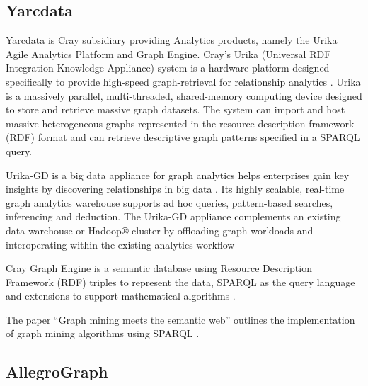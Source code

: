 {     \pv
     
\subsection{Yarcdata \cv}

     Yarcdata is Cray subsidiary providing Analytics
     products, namely the Urika Agile Analytics Platform and Graph
     Engine. Cray’s Urika (Universal RDF Integration Knowledge
     Appliance) system is a hardware
     platform designed specifically to provide high-speed
     graph-retrieval for relationship analytics \cite{www-Urika-appliance}.
     Urika is a massively
     parallel, multi-threaded, shared-memory computing device designed
     to store and retrieve massive graph datasets. The system can
     import and host massive heterogeneous graphs represented in the
     resource description framework (RDF) format and can retrieve
     descriptive graph patterns specified in a SPARQL query.

     Urika-GD is a big data appliance for
     graph analytics helps enterprises gain key insights by
     discovering relationships in big data \cite{techspec-Urika-GD}.
     Its highly scalable,
     real-time graph analytics warehouse supports ad hoc queries,
     pattern-based searches, inferencing and deduction. The Urika-GD
     appliance complements an existing data warehouse or Hadoop®
     cluster by offloading graph workloads and interoperating within
     the existing analytics workflow

     Cray Graph Engine is a semantic database
     using Resource Description Framework (RDF) triples to represent
     the data, SPARQL as the query language and extensions to support
     mathematical algorithms \cite{paper-graph-data}.

     The paper ``Graph mining meets the semantic web''
     outlines the implementation of graph
     mining algorithms using SPARQL \cite{paper-lee2015graph}.

     \pv

\subsection{AllegroGraph}
     
}
